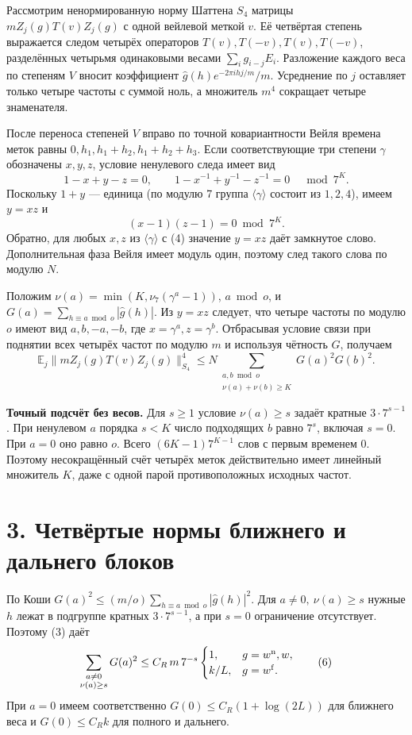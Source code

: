 \documentclass[11pt,a4paper]{article}
\newcommand{\EE}{\mathbb E}
\newcommand{\sect}[1]{\section*{\sffamily\color{ink}#1}}
\newcommand{\subt}[1]{\par\medskip\noindent\textbf{#1.}\quad}
\begin{document}
Рассмотрим ненормированную норму Шаттена \(S_4\) матрицы \(mZ_j(g)T(v)Z_j(g)\) с одной вейлевой меткой \(v\). Её четвёртая степень выражается следом четырёх операторов \(T(v),T(-v),T(v),T(-v)\), разделённых четырьмя одинаковыми весами \(\sum_i g_{i-j}E_i\). Разложение каждого веса по степеням \(V\) вносит коэффициент \(\widehat g(h)e^{-2\pi i hj/m}/m\). Усреднение по \(j\) оставляет только четыре частоты с суммой ноль, а множитель \(m^4\) сокращает четыре знаменателя.

После переноса степеней \(V\) вправо по точной ковариантности Вейля времена меток равны \(0,h_1,h_1+h_2,h_1+h_2+h_3\). Если соответствующие три степени \(\gamma\) обозначены \(x,y,z\), условие ненулевого следа имеет вид
\[
             1-x+y-z=0,\qquad 1-x^{-1}+y^{-1}-z^{-1}=0
                         \quad\bmod 7^K.
\]
Поскольку \(1+y\) --- единица (по модулю 7 группа \(\langle\gamma\rangle\) состоит из \(1,2,4\)), имеем \(y=xz\) и
\begin{equation}
                        (x-1)(z-1)=0\bmod7^K .                  \tag{4}
\end{equation}
Обратно, для любых \(x,z\) из \(\langle\gamma\rangle\) с (4) значение \(y=xz\) даёт замкнутое слово. Дополнительная фаза Вейля имеет модуль один, поэтому след такого слова по модулю \(N\).

Положим \(\nu(a)=\min(K,\nu_7(\gamma^a-1))\), \(a\bmod o\), и
\(G(a)=\sum_{h\equiv a\bmod o}|\widehat g(h)|\). Из \(y=xz\) следует, что четыре частоты по модулю \(o\) имеют вид \(a,b,-a,-b\), где \(x=\gamma^a,z=\gamma^b\). Отбрасывая условие связи при поднятии всех четырёх частот по модулю \(m\) и используя чётность \(G\), получаем
\begin{equation}
 \EE_j\|mZ_j(g)T(v)Z_j(g)\|_{S_4}^4
     \le N\sum_{\substack{a,b\bmod o\\\nu(a)+\nu(b)\ge K}}G(a)^2G(b)^2 .
                                                                 \tag{5}
\end{equation}

\subt{Точный подсчёт без весов}
Для \(s\ge1\) условие \(\nu(a)\ge s\) задаёт кратные \(3\cdot7^{s-1}\). При ненулевом \(a\) порядка \(s<K\) число подходящих \(b\) равно \(7^s\), включая \(s=0\). При \(a=0\) оно равно \(o\). Всего \((6K-1)7^{K-1}\) слов с первым временем \(0\). Поэтому несокращённый счёт четырёх меток действительно имеет линейный множитель \(K\), даже с одной парой противоположных исходных частот.
\newpage
\sect{3. Четвёртые нормы ближнего и дальнего блоков}
По Коши \(G(a)^2\le(m/o)\sum_{h\equiv a\bmod o}|\widehat g(h)|^2\). Для \(a\ne0,\ \nu(a)\ge s\) нужные \(h\) лежат в подгруппе кратных \(3\cdot7^{s-1}\), а при \(s=0\) ограничение отсутствует. Поэтому (3) даёт
\[
 \sum_{\substack{a\ne0\\\nu(a)\ge s}} G(a)^2
 \le C_R\,m\,7^{-s}
           \begin{cases}1,& g=w^{\rm n},w,\\ k/L,&g=w^{\rm f}.\end{cases}
                                                               \tag{6}
\]
При \(a=0\) имеем соответственно \(G(0)\le C_R(1+\log(2L))\) для ближнего веса и \(G(0)\le C_R k\) для полного и дальнего.
\end{document}
